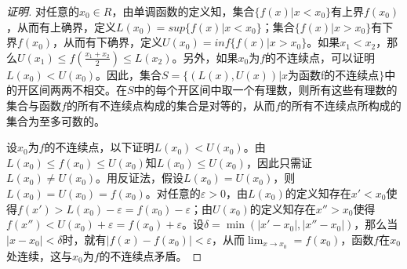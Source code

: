 \begin{proof}[证明]
  对任意的$x_0\in R$，由单调函数的定义知，集合$\{f(x)|x<x_0\}$有上界$f(x_0)$，从而有上确界，定义$L(x_0)=sup \{f(x)|x<x_0\}$；集合$\{f(x)|x>x_0\}$有下界$f(x_0)$，从而有下确界，定义$U(x_0)=inf \{f(x)|x>x_0\}$。如果$x_1<x_2$，那么$U(x_1)\leq f(\frac{x_1+x_2}{2}) \leq L(x_2)$。另外，如果$x_0$为$f$的不连续点，可以证明$L(x_0) <  U(x_0)$。因此，集合$S=\{(L(x),U(x))|x\text{为函数}$f$\text{的不连续点}\}$中的开区间两两不相交。在$S$中的每个开区间中取一个有理数，则所有这些有理数的集合与函数$f$的所有不连续点构成的集合是对等的，从而$f$的所有不连续点所构成的集合为至多可数的。

  设$x_0$为$f$的不连续点，以下证明$L(x_0) <  U(x_0)$。由$L(x_0)\leq f(x_0) \leq U(x_0)$知$L(x_0) \leq U(x_0)$，因此只需证$L(x_0)\neq U(x_0)$。用反证法，假设$L(x_0)=U(x_0)$，则$L(x_0)=U(x_0)=f(x_0)$。对任意的$\varepsilon >0$，由$L(x_0)$的定义知存在$x'<x_0$使得$f(x')>L(x_0)-\varepsilon=f(x_0)-\varepsilon$；由$U(x_0)$的定义知存在$x''>x_0$使得$f(x'')<U(x_0) + \varepsilon=f(x_0) + \varepsilon$。设$\delta = \min (|x'-x_0|, |x''-x_0|)$，那么当$|x-x_0|< \delta$时，就有$|f(x)-f(x_0)|<\varepsilon$，从而$\lim_{x\to x_0}=f(x_0)$，函数$f$在$x_0$处连续，这与$x_0$为$f$的不连续点矛盾。
\end{proof}
